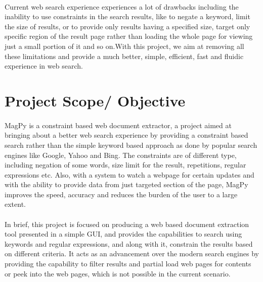 \documentclass[a4paper]{report}
\begin{document}
\paragraph{}
\large\textnormal{Current web search experience experiences a lot of drawbacks including the
inability to use constraints in the search results, like to negate a keyword, limit the size of results, or to provide only results having a specified size, target only specific region of the result page rather than loading the whole page for viewing just a small portion of it and so on.With this project, we aim at removing all these limitations and provide a much better, simple, efficient, fast and fluidic experience in web search.}
\section{Project Scope/ Objective}
\paragraph{}
\large\textnormal{MagPy is a constraint based web document extractor, a project aimed at bringing about a better web search experience by providing a constraint based search rather than the simple keyword based approach as done by popular search engines like Google, Yahoo and Bing. The constraints are of different type, including negation of some words, size limit for the result, repetitions, regular expressions
etc. Also, with a system to watch a webpage for certain updates and with the ability to provide data from just targeted section of the page, MagPy improves the speed, accuracy and reduces the burden of the user to a large extent.}
\paragraph{}
\large\textnormal{In brief, this project is focused on producing a web based document extraction tool presented in a simple GUI, and provides the capabilities to search using keywords and regular expressions, and along with it, constrain the results based on different criteria. It acts as an advancement over the modern search engines by providing the capability to filter results and partial load web pages for contents or peek into the web pages, which is not possible in the current scenario.}
\end{document}
